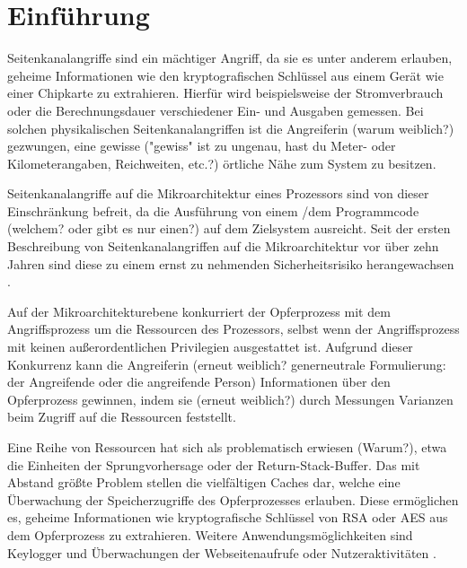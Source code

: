 \chapter{Einführung}
\label{chapter:introduction}


Seitenkanalangriffe sind ein mächtiger Angriff, da sie es unter anderem erlauben, geheime Informationen wie den kryptografischen Schlüssel aus einem Gerät wie einer Chipkarte zu extrahieren.
Hierfür wird beispielsweise der Stromverbrauch oder die Berechnungsdauer verschiedener Ein- und Ausgaben gemessen.
Bei solchen physikalischen Seitenkanalangriffen ist die Angreiferin (warum weiblich?) gezwungen, eine gewisse ("gewiss" ist zu ungenau, hast du Meter- oder Kilometerangaben, Reichweiten, etc.?) örtliche Nähe zum System zu besitzen.

Seitenkanalangriffe auf die Mikroarchitektur eines Prozessors sind von dieser Einschränkung befreit, da die
Ausführung von einem /dem Programmcode (welchem? oder gibt es nur einen?)
auf dem Zielsystem ausreicht.
Seit der ersten Beschreibung von Seitenkanalangriffen auf die Mikroarchitektur vor über zehn Jahren \cite{FirstCacheAttackDES} sind diese zu einem ernst zu nehmenden Sicherheitsrisiko herangewachsen \cite{OpenBSDHyperthreading}.

Auf der Mikroarchitekturebene konkurriert der Opferprozess mit dem Angriffsprozess um die Ressourcen des Prozessors, selbst wenn der Angriffsprozess mit keinen außerordentlichen Privilegien ausgestattet ist.
Aufgrund dieser Konkurrenz kann die Angreiferin (erneut weiblich? generneutrale Formulierung: der Angreifende oder die angreifende Person) Informationen über den Opferprozess gewinnen, indem sie (erneut weiblich?) durch Messungen Varianzen beim Zugriff auf die Ressourcen feststellt.

Eine Reihe von Ressourcen hat sich als problematisch erwiesen (Warum?), etwa die Einheiten der Sprungvorhersage oder der Return-Stack-Buffer.
Das mit Abstand größte Problem stellen die vielfältigen Caches dar, welche eine Überwachung der Speicherzugriffe des Opferprozesses erlauben.
Diese ermöglichen es, geheime Informationen wie kryptografische Schlüssel von RSA \cite{CacheBleedOpenSSLRSA} oder AES \cite{BernsteinAES} aus dem Opferprozess zu extrahieren.
Weitere Anwendungsmöglichkeiten sind Keylogger \cite{Keylogger} und Überwachungen der Webseitenaufrufe oder Nutzeraktivitäten \cite{TheSpyInTheSandbox}.

